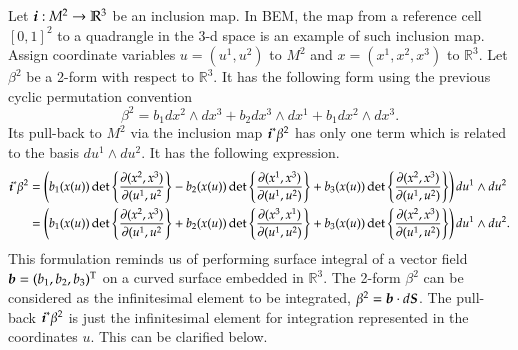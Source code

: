 \documentclass[11pt, a4paper]{book}
\begin{document}
\begin{Example}
  Let $\boldsymbol{i}: M^2 \rightarrow \mathbb{R}^3$ be an inclusion map. In BEM, the map from a
  reference cell $[0,1]^2$ to a quadrangle in the 3-d space is an example of such
  inclusion map. Assign coordinate variables $u = (u^1,u^2)$ to $M^2$ and
  $x = (x^1,x^2,x^3)$ to $\mathbb{R}^3$. Let $\beta^2$ be a 2-form with respect to
  $\mathbb{R}^3$. It has the following form using the previous cyclic permutation
  convention
  \begin{equation*}
    \beta^2 = b_1 dx^2 \wedge dx^3 + b_2 dx^3 \wedge dx^1 + b_1 dx^2 \wedge dx^3.
  \end{equation*}
  Its pull-back to $M^2$ via the inclusion map $\boldsymbol{i}^{*}\beta^2$ has only one term
  which is related to the basis $du^1 \wedge du^2$. It has the following expression.
  \begin{align*}
    \boldsymbol{i}^{*}\beta^2
    &= \left( b_1(x(u)) \det \left\{ \frac{\partial (x^2, x^3)}{\partial (u^1,u^2} \right\} -
      b_2(x(u)) \det \left\{ \frac{\partial (x^1,x^3)}{\partial (u^1,u^2)} \right\} +
      b_3(x(u)) \det \left\{ \frac{\partial (x^2,x^3)}{\partial (u^1,u^2)} \right\} \right)
      du^1 \wedge du^2 \\
    &= \left( b_1(x(u)) \det \left\{ \frac{\partial (x^2, x^3)}{\partial (u^1,u^2} \right\} +
      b_2(x(u)) \det \left\{ \frac{\partial (x^3,x^1)}{\partial (u^1,u^2)} \right\} +
      b_3(x(u)) \det \left\{ \frac{\partial (x^2,x^3)}{\partial (u^1,u^2)} \right\} \right)
      du^1 \wedge du^2.
  \end{align*}
  This formulation reminds us of performing surface integral of a vector field
  $\boldsymbol{b} = (b_1,b_2,b_3)^{\mathrm{T}}$ on a curved surface embedded in $\mathbb{R}^3$.
  The 2-form $\beta^2$ can be considered as the infinitesimal element to be integrated,
  $\beta^2 = \boldsymbol{b} \cdot d \boldsymbol{S}$. The pull-back $\boldsymbol{i}^{*}\beta^2$ is just the
  infinitesimal element for integration represented in the coordinates $u$. This can be
  clarified below.


\end{Example}
\end{document}
